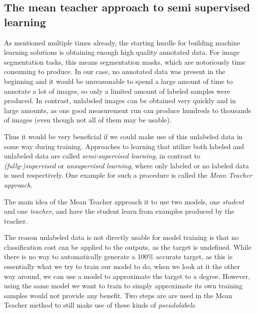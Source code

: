 \subsection{The mean teacher approach to semi supervised learning}
\label{sec:mean_teacher}

As mentioned multiple times already, the starting hurdle for building machine learning solutions is obtaining enough high quality annotated data. 
For image segmentation tasks, this means segmentation masks, which are notoriously time consuming to produce. 
In our case, no annotated data was present in the beginning and it would be unreasonable to spend a large amount of time to annotate a lot of images, so only a limited amount of labeled samples were produced. 
In contrast, unlabeled images can be obtained very quickly and in large amounts, as one good measurement run can produce hundreds to thousands of images (even though not all of them may be usable).

Thus it would be very beneficial if we could make use of this unlabeled data in some way during training. 
Approaches to learning that utilize both labeled and unlabeled data are called \emph{semi-supervised learning}, in contrast to \emph{(fully-)supervised} or \emph{unsupervised learning}, where only labeled or no labeled data is used respectively. 
One example for such a procedure is called the \emph{Mean Teacher approach}.\cite{tarvainenMeanTeachersAre2018}

The main idea of the Mean Teacher approach it to use two models, one \emph{student} and one \emph{teacher}, and have the student learn from examples produced by the teacher.

The reason unlabeled data is not directly usable for model training is that no classification cost can be applied to the outputs, as the target is undefined.
While there is no way to automatically generate a 100\% accurate target, as this is essentially what we try to train our model to do, when we look at it the other way around, we can use a model to approximate the target to a degree.
However, using the same model we want to train to simply approximate its own training samples would not provide any benefit.
Two steps are are used in the Mean Teacher method to still make use of these kinds of \emph{pseudolabels}.

